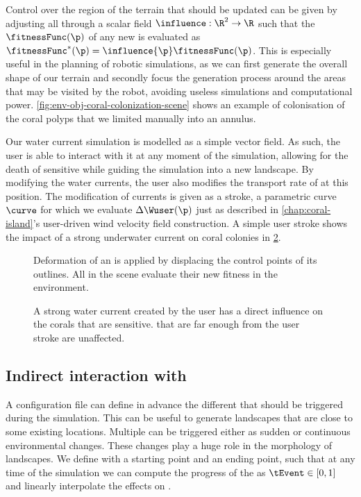 Control over the region of the terrain that should be updated can be given by adjusting all  through a scalar field $\influence: \R^2 \to \R $ such that the  $\fitnessFunc(\p)$ of any new  is evaluated as $\fitnessFunc^*(\p) = \influence{\p} \fitnessFunc(\p)$. This is especially useful in the planning of robotic simulations, as we can first generate the overall shape of our terrain and secondly focus the generation process around the areas that may be visited by the robot, avoiding useless simulations and computational power.
\cref{fig:env-obj-coral-colonization-scene} shows an example of colonisation of the coral polyps that we limited manually into an annulus.

Our water current simulation is modelled as a simple vector field. As such, the user is able to interact with it at any moment of the simulation, allowing for the death of sensitive  while guiding the simulation into a new landscape. By modifying the water currents, the user also modifies the transport rate of  at this position. The modification of currents is given as a stroke, a parametric curve $\curve$ for which we evaluate $\Delta \Wuser(\p)$ just as described in \cref{chap:coral-island}'s user-driven wind velocity field construction. A simple user stroke shows the impact of a strong underwater current on coral colonies in \cref{fig:env-obj-user-flow-effects}.

\begin{figure}
\caption{Deformation of an  is applied by displacing the control points of its outlines. All  in the scene evaluate their new fitness in the environment.}
\label{fig:env-obj-island-deformation}
\end{figure}

\begin{figure}
\caption{A strong water current created by the user has a direct influence on the corals that are sensitive.  that are far enough from the user stroke are unaffected.}
\label{fig:env-obj-user-flow-effects}
\end{figure}

\subsection{Indirect interaction with }
\label{sec:env-obj-events}
A configuration file can define in advance the different  that should be triggered during the simulation. This can be useful to generate landscapes that are close to some existing locations.
Multiple  can be triggered either as sudden or continuous environmental changes. These changes play a huge role in the morphology of landscapes.
We define  with a starting point and an ending point, such that at any time of the simulation we can compute the progress of the  as $\tEvent \in [0, 1]$ and linearly interpolate the effects on .

